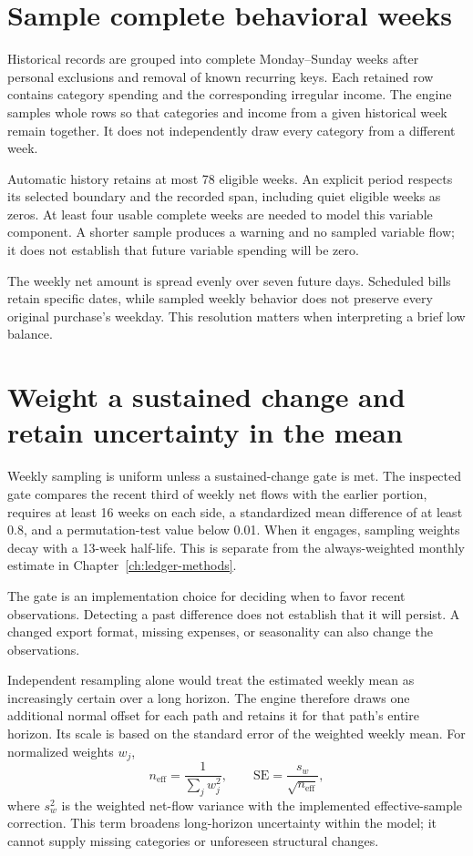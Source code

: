 \section{Sample complete behavioral weeks}
Historical records are grouped into complete Monday--Sunday weeks after personal exclusions and removal of known recurring keys. Each retained row contains category spending and the corresponding irregular income. The engine samples whole rows so that categories and income from a given historical week remain together. It does not independently draw every category from a different week.

Automatic history retains at most 78 eligible weeks. An explicit period respects its selected boundary and the recorded span, including quiet eligible weeks as zeros. At least four usable complete weeks are needed to model this variable component. A shorter sample produces a warning and no sampled variable flow; it does not establish that future variable spending will be zero.

The weekly net amount is spread evenly over seven future days. Scheduled bills retain specific dates, while sampled weekly behavior does not preserve every original purchase's weekday. This resolution matters when interpreting a brief low balance.

\section{Weight a sustained change and retain uncertainty in the mean}
Weekly sampling is uniform unless a sustained-change gate is met. The inspected gate compares the recent third of weekly net flows with the earlier portion, requires at least 16 weeks on each side, a standardized mean difference of at least 0.8, and a permutation-test value below 0.01. When it engages, sampling weights decay with a 13-week half-life. This is separate from the always-weighted monthly estimate in Chapter~\ref{ch:ledger-methods}.

The gate is an implementation choice for deciding when to favor recent observations. Detecting a past difference does not establish that it will persist. A changed export format, missing expenses, or seasonality can also change the observations.

Independent resampling alone would treat the estimated weekly mean as increasingly certain over a long horizon. The engine therefore draws one additional normal offset for each path and retains it for that path's entire horizon. Its scale is based on the standard error of the weighted weekly mean. For normalized weights \(w_j\),
\[
 n_{\mathrm{eff}}=\frac{1}{\sum_j w_j^2},\qquad
 \mathrm{SE}=\frac{s_w}{\sqrt{n_{\mathrm{eff}}}},
\]
where \(s_w^2\) is the weighted net-flow variance with the implemented effective-sample correction. This term broadens long-horizon uncertainty within the model; it cannot supply missing categories or unforeseen structural changes.

